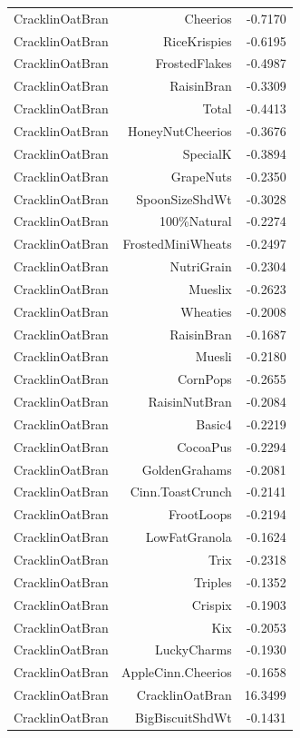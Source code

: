 \begin{longtable}{@{}lrr@{}}
CracklinOatBran & Cheerios & -0.7170 \\
CracklinOatBran & RiceKrispies & -0.6195 \\
CracklinOatBran & FrostedFlakes & -0.4987 \\
CracklinOatBran & RaisinBran & -0.3309 \\
CracklinOatBran & Total & -0.4413 \\
CracklinOatBran & HoneyNutCheerios & -0.3676 \\
CracklinOatBran & SpecialK & -0.3894 \\
CracklinOatBran & GrapeNuts & -0.2350 \\
CracklinOatBran & SpoonSizeShdWt & -0.3028 \\
CracklinOatBran & 100\%Natural & -0.2274 \\
CracklinOatBran & FrostedMiniWheats & -0.2497 \\
CracklinOatBran & NutriGrain & -0.2304 \\
CracklinOatBran & Mueslix & -0.2623 \\
CracklinOatBran & Wheaties & -0.2008 \\
CracklinOatBran & RaisinBran & -0.1687 \\
CracklinOatBran & Muesli & -0.2180 \\
CracklinOatBran & CornPops & -0.2655 \\
CracklinOatBran & RaisinNutBran & -0.2084 \\
CracklinOatBran & Basic4 & -0.2219 \\
CracklinOatBran & CocoaPus & -0.2294 \\
CracklinOatBran & GoldenGrahams & -0.2081 \\
CracklinOatBran & Cinn.ToastCrunch & -0.2141 \\
CracklinOatBran & FrootLoops & -0.2194 \\
CracklinOatBran & LowFatGranola & -0.1624 \\
CracklinOatBran & Trix & -0.2318 \\
CracklinOatBran & Triples & -0.1352 \\
CracklinOatBran & Crispix & -0.1903 \\
CracklinOatBran & Kix & -0.2053 \\
CracklinOatBran & LuckyCharms & -0.1930 \\
CracklinOatBran & AppleCinn.Cheerios & -0.1658 \\
CracklinOatBran & CracklinOatBran & 16.3499 \\
CracklinOatBran & BigBiscuitShdWt & -0.1431 \\

\end{longtable}
